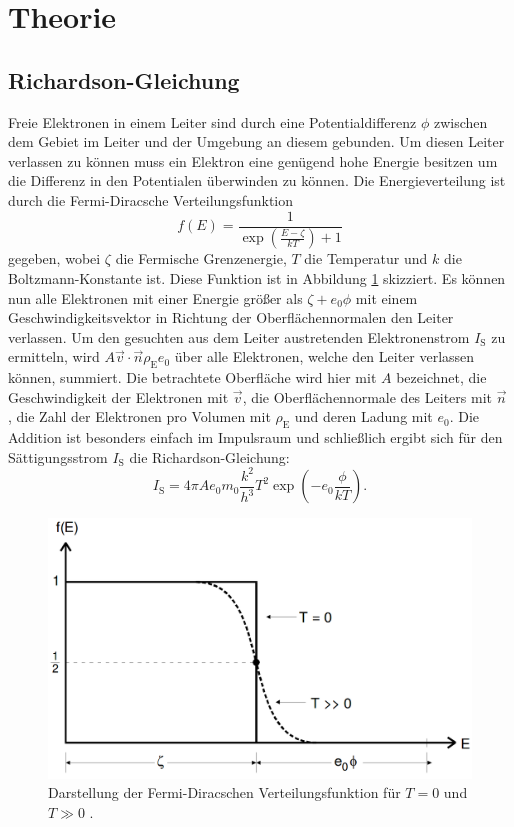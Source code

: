 
\section{Theorie}
\label{sec:Theorie}

\subsection{Richardson-Gleichung}
Freie Elektronen in einem Leiter sind durch eine Potentialdifferenz $\phi$ zwischen dem Gebiet im Leiter und der Umgebung an diesem gebunden. Um diesen Leiter verlassen zu können muss ein Elektron eine genügend hohe Energie besitzen um die Differenz in den Potentialen überwinden zu können. Die Energieverteilung ist durch die Fermi-Diracsche Verteilungsfunktion 
\begin{equation}
	f(E) = \frac{1}{\exp\left(\frac{E-\zeta}{k T}\right)+1}\label{eq:Fermi-Diracsche_Verteilungsfunktion}
\end{equation} 
gegeben, wobei $\zeta$ die Fermische Grenzenergie, $T$ die Temperatur und $k$ die Boltzmann-Konstante ist. Diese Funktion ist in Abbildung \ref{fig:Fermi-Diracsche} skizziert. Es können nun alle Elektronen mit einer Energie größer als $\zeta + e_0 \phi$ mit einem Geschwindigkeitsvektor in Richtung der Oberflächennormalen den Leiter verlassen. Um den gesuchten aus dem Leiter austretenden Elektronenstrom $I_\text{S}$ zu ermitteln, wird $A \vec{v}\cdot \vec{n} \rho_\text{E} e_0$ über alle Elektronen, welche den Leiter verlassen können, summiert. Die betrachtete Oberfläche wird hier mit $A$ bezeichnet, die Geschwindigkeit der Elektronen mit $\vec{v}$, die Oberflächennormale des Leiters mit $\vec{n}$ , die Zahl der Elektronen pro Volumen mit $\rho_\text{E}$ und deren Ladung mit $e_0$. Die Addition ist besonders einfach im Impulsraum und schließlich ergibt sich für den Sättigungsstrom $I_\text{S}$ die Richardson-Gleichung: 
\begin{equation}
	I_\text{S} = 4 \pi A e_0 m_0 \frac{k^2}{h^3} T^2 \exp\left(-e_0 \frac{\phi}{k T}\right)\text{.} \label{eq:Richardson-Gleichung}
\end{equation}
\begin{figure}
	\centering
	\includegraphics[width=\linewidth-100pt,height=\textheight-100pt,keepaspectratio]{content/Bilder/Fermi-Diracsche_Verteilung.png}
	\caption{Darstellung der Fermi-Diracschen Verteilungsfunktion für $T=0$ und $T\gg0$ \cite{V504}.}
	\label{fig:Fermi-Diracsche}
\end{figure}

